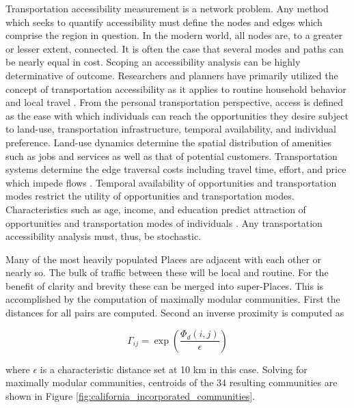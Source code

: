 Transportation accessibility measurement is a network problem. Any method which seeks to quantify accessibility must define the nodes and edges which comprise the region in question. In the modern world, all nodes are, to a greater or lesser extent, connected. It is often the case that several modes and paths can be nearly equal in cost. Scoping an accessibility analysis can be highly determinative of outcome. Researchers and planners have primarily utilized the concept of transportation accessibility as it applies to routine household behavior and local travel \cite{Handy_2020}. From the personal transportation perspective, access is defined as the ease with which individuals can reach the opportunities they desire subject to land-use, transportation infrastructure, temporal availability, and individual preference. Land-use dynamics determine the spatial distribution of amenities such as jobs and services as well as that of potential customers. Transportation systems determine the edge traversal costs including travel time, effort, and price which impede flows \cite{Geurs_2004}. Temporal availability of opportunities and transportation modes restrict the utility of opportunities and transportation modes. Characteristics such as age, income, and education predict attraction of opportunities and transportation modes of individuals \cite{Miller_2018}. Any transportation accessibility analysis must, thus, be stochastic.


Many of the most heavily populated Places are adjacent with each other or nearly so. The bulk of traffic between these will be local and routine. For the benefit of clarity and brevity these can be merged into super-Places. This is accomplished by the computation of maximally modular communities. First the distances for all pairs are computed. Second an inverse proximity is computed as

\begin{equation}
	\Gamma_{ij} = \exp{\left(\frac{\Phi_d(i,j)}{\epsilon}\right)}
\end{equation}

where $\epsilon$ is a characteristic distance set at 10 km in this case. Solving for maximally modular communities, centroids of the 34 resulting communities are shown in Figure \ref{fig:california_incorporated_communities}.

